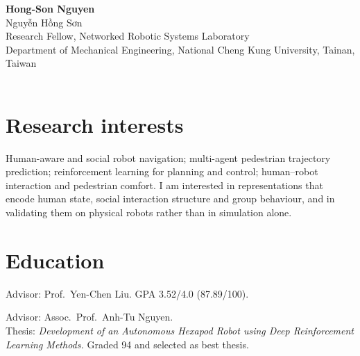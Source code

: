 \documentclass[10pt]{article}
\begin{document}
{\fontsize{22}{26}\selectfont\bfseries Hong-Son Nguyen}\\[2pt]
{\color{muted}\fontsize{10.5}{13}\selectfont Nguyễn Hồng Sơn}\\[7pt]
{\fontsize{10}{14}\selectfont
Research Fellow, Networked Robotic Systems Laboratory\\
Department of Mechanical Engineering, National Cheng Kung University, Tainan, Taiwan}\\[8pt]
{\fontsize{9.4}{14}\selectfont
{} \quad
{} \quad
{}\\[2pt]
 \quad
{} \quad
{} \quad
{}}

\section{Research interests}
{\fontsize{9.8}{12.6}\selectfont
Human-aware and social robot navigation; multi-agent pedestrian trajectory
prediction; reinforcement learning for planning and control; human--robot
interaction and pedestrian comfort. I am interested in representations that
encode human state, social interaction structure and group behaviour, and in
validating them on physical robots rather than in simulation alone.}

\section{Education}

\begin{detail}
Advisor: Prof.\ Yen-Chen Liu. \quad GPA 3.52/4.0 (87.89/100).
\end{detail}

\begin{detail}
Advisor: Assoc.\ Prof.\ Anh-Tu Nguyen.\\
Thesis: \emph{Development of an Autonomous Hexapod Robot using Deep
Reinforcement Learning Methods.} Graded 94 and selected as best thesis.
\end{detail}
\end{document}
